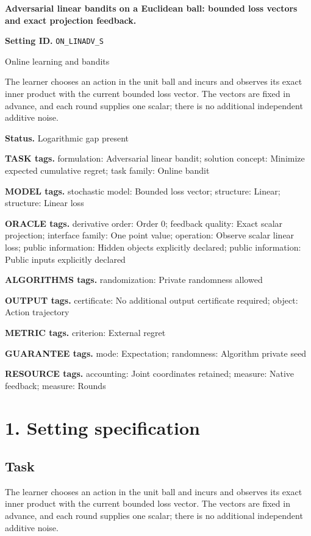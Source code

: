 \documentclass[10pt,a4paper]{article}
\begin{document}
\raggedright

{\LARGE\bfseries\sffamily\color{AtlasNavy} Adversarial linear bandits on a Euclidean ball: bounded loss vectors and exact projection feedback.\par}\vspace{5pt}
\textbf{Setting ID.} \texttt{ON\_\allowbreak{}LINADV\_\allowbreak{}S}

Online learning and bandits

The learner chooses an action in the unit ball and incurs and observes its exact inner product with the current bounded loss vector. The vectors are fixed in advance, and each round supplies one scalar; there is no additional independent additive noise.

\textbf{Status.} Logarithmic gap present

\textbf{TASK tags.} formulation: Adversarial linear bandit; solution concept: Minimize expected cumulative regret; task family: Online bandit

\textbf{MODEL tags.} stochastic model: Bounded loss vector; structure: Linear; structure: Linear loss

\textbf{ORACLE tags.} derivative order: Order 0; feedback quality: Exact scalar projection; interface family: One point value; operation: Observe scalar linear loss; public information: Hidden objects explicitly declared; public information: Public inputs explicitly declared

\textbf{ALGORITHMS tags.} randomization: Private randomness allowed

\textbf{OUTPUT tags.} certificate: No additional output certificate required; object: Action trajectory

\textbf{METRIC tags.} criterion: External regret

\textbf{GUARANTEE tags.} mode: Expectation; randomness: Algorithm private seed

\textbf{RESOURCE tags.} accounting: Joint coordinates retained; measure: Native feedback; measure: Rounds

\section{1. Setting specification}
\subsection{Task}
The learner chooses an action in the unit ball and incurs and observes its exact inner product with the current bounded loss vector. The vectors are fixed in advance, and each round supplies one scalar; there is no additional independent additive noise.
\end{document}
